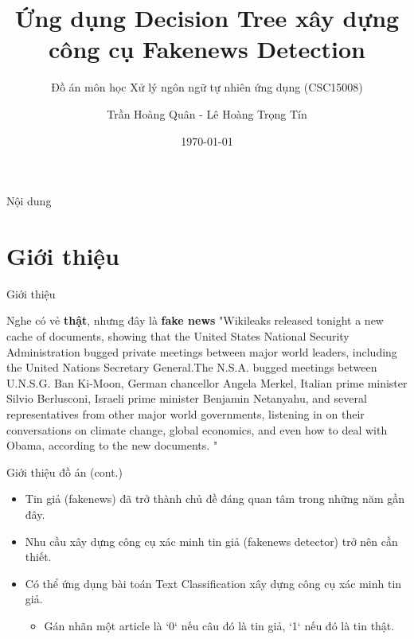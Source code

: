 \documentclass[aspectratio=169,xcolor=dvipsnames]{beamer}
\title[Fakenews Detection]{Ứng dụng Decision Tree xây dựng \\ công cụ Fakenews Detection} %
\subtitle{Đồ án môn học Xử lý ngôn ngữ tự nhiên ứng dụng (CSC15008)}
\author[Quan-Tran] {Trần Hoàng Quân - Lê Hoàng Trọng Tín}
\institute[HCMUS] %
{
    Khoa Công nghệ thông tin \\
    Trường Đại học Khoa học Tự nhiên - ĐHQG HCM %
}
\date{\today} %
\begin{document}
\begin{frame}
    \titlepage
\end{frame}

\begin{frame}{Nội dung}
    \tableofcontents
\end{frame}

\section{Giới thiệu}

\begin{frame}{Giới thiệu}
\begin{alertblock}{Nghe có vẻ \textbf{thật}, nhưng đây là \textbf{fake news}}
"Wikileaks released tonight a new cache of documents, showing that the United States  National Security Administration bugged private meetings between major world leaders, including the United Nations Secretary General.The N.S.A. bugged meetings between U.N.S.G. Ban Ki-Moon, German chancellor Angela Merkel, Italian prime minister Silvio Berlusconi, Israeli prime minister Benjamin Netanyahu, and several representatives from other major world governments, listening in on their conversations on climate change, global economics, and even  how to deal with Obama,  according to the new documents. "
\end{alertblock}
\end{frame}

\begin{frame}{Giới thiệu đồ án (cont.)}
\begin{itemize}
\item Tin giả (fakenews) đã trở thành chủ đề đáng quan tâm trong những năm gần đây.
\item Nhu cầu xây dựng công cụ xác minh tin giả (fakenews detector) trở nên cần thiết.
\item Có thể ứng dụng bài toán Text Classification xây dựng công cụ xác minh tin giả.
\begin{itemize}
    \item Gán nhãn một article là `0` nếu câu đó là tin giả, `1` nếu đó là tin thật.
\end{itemize}
\end{itemize}
\end{frame}
\end{document}
